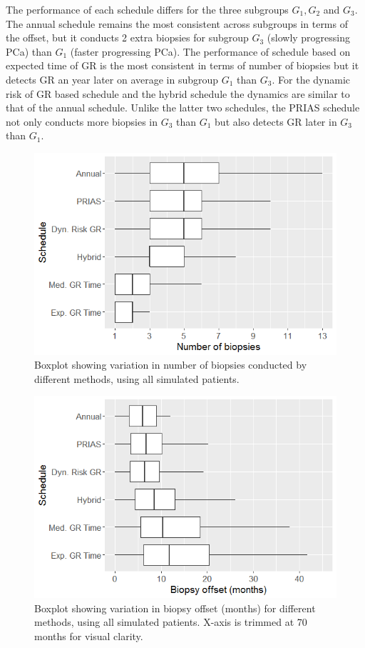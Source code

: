 The performance of each schedule differs for the three subgroups $G_1, G_2$ and $G_3$. The annual schedule remains the most consistent across subgroups in terms of the offset, but it conducts 2 extra biopsies for subgroup $G_3$ (slowly progressing PCa) than $G_1$ (faster progressing PCa). The performance of schedule based on expected time of GR is the most consistent in terms of number of biopsies but it detects GR an year later on average in subgroup $G_1$ than $G_3$. For the dynamic risk of GR based schedule and the hybrid schedule the dynamics are similar to that of the annual schedule. Unlike the latter two schedules, the PRIAS schedule not only conducts more biopsies in $G_3$ than $G_1$ but also detects GR later in $G_3$ than $G_1$.

\begin{figure}[!htb]
\centerline{\includegraphics[width=\columnwidth]{images/sim_study/nbBoxPlot_all.png}}
\caption{Boxplot showing variation in number of biopsies conducted by different methods, using all simulated patients.}
\label{fig : nbBoxPlot_all}
\end{figure}

\begin{figure}[!htb]
\centerline{\includegraphics[width=\columnwidth]{images/sim_study/offsetBoxPlot_all.png}}
\caption{Boxplot showing variation in biopsy offset (months) for different methods, using all simulated patients. X-axis is trimmed at 70 months for visual clarity.}
\label{fig : offsetBoxPlot_all}
\end{figure}

